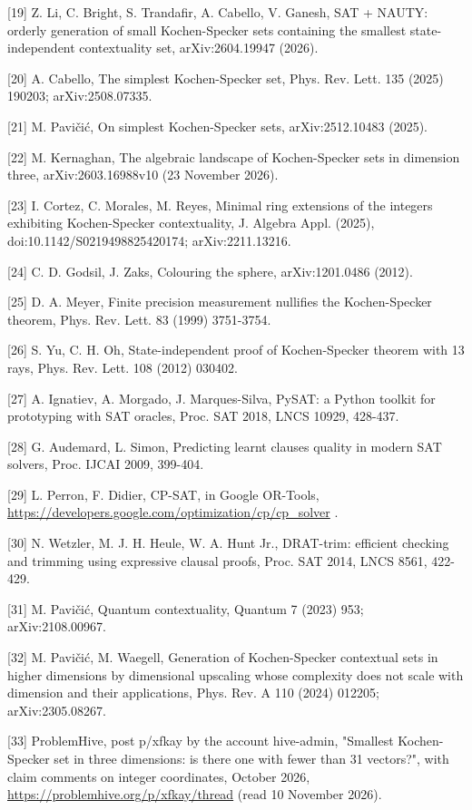 \documentclass[11pt,a4paper]{article}
\begin{document}
{[}19{]} Z. Li, C. Bright, S. Trandafir, A. Cabello, V. Ganesh, SAT + NAUTY: orderly generation of small Kochen-Specker sets containing the smallest state-independent contextuality set, arXiv:2604.19947 (2026).

{[}20{]} A. Cabello, The simplest Kochen-Specker set, Phys. Rev. Lett. 135 (2025) 190203; arXiv:2508.07335.

{[}21{]} M. Pavičić, On simplest Kochen-Specker sets, arXiv:2512.10483 (2025).

{[}22{]} M. Kernaghan, The algebraic landscape of Kochen-Specker sets in dimension three, arXiv:2603.16988v10 (23 November 2026).

{[}23{]} I. Cortez, C. Morales, M. Reyes, Minimal ring extensions of the integers exhibiting Kochen-Specker contextuality, J. Algebra Appl. (2025), doi:10.1142/S0219498825420174; arXiv:2211.13216.

{[}24{]} C. D. Godsil, J. Zaks, Colouring the sphere, arXiv:1201.0486 (2012).

{[}25{]} D. A. Meyer, Finite precision measurement nullifies the Kochen-Specker theorem, Phys. Rev. Lett. 83 (1999) 3751-3754.

{[}26{]} S. Yu, C. H. Oh, State-independent proof of Kochen-Specker theorem with 13 rays, Phys. Rev. Lett. 108 (2012) 030402.

{[}27{]} A. Ignatiev, A. Morgado, J. Marques-Silva, PySAT: a Python toolkit for prototyping with SAT oracles, Proc. SAT 2018, LNCS 10929, 428-437.

{[}28{]} G. Audemard, L. Simon, Predicting learnt clauses quality in modern SAT solvers, Proc. IJCAI 2009, 399-404.

{[}29{]} L. Perron, F. Didier, CP-SAT, in Google OR-Tools, \url{https://developers.google.com/optimization/cp/cp_solver} .

{[}30{]} N. Wetzler, M. J. H. Heule, W. A. Hunt Jr., DRAT-trim: efficient checking and trimming using expressive clausal proofs, Proc. SAT 2014, LNCS 8561, 422-429.

{[}31{]} M. Pavičić, Quantum contextuality, Quantum 7 (2023) 953; arXiv:2108.00967.

{[}32{]} M. Pavičić, M. Waegell, Generation of Kochen-Specker contextual sets in higher dimensions by dimensional upscaling whose complexity does not scale with dimension and their applications, Phys. Rev. A 110 (2024) 012205; arXiv:2305.08267.

{[}33{]} ProblemHive, post p/xfkay by the account hive-admin, "Smallest Kochen-Specker set in three dimensions: is there one with fewer than 31 vectors?", with claim comments on integer coordinates, October 2026, \url{https://problemhive.org/p/xfkay/thread} (read 10 November 2026).
\end{document}
